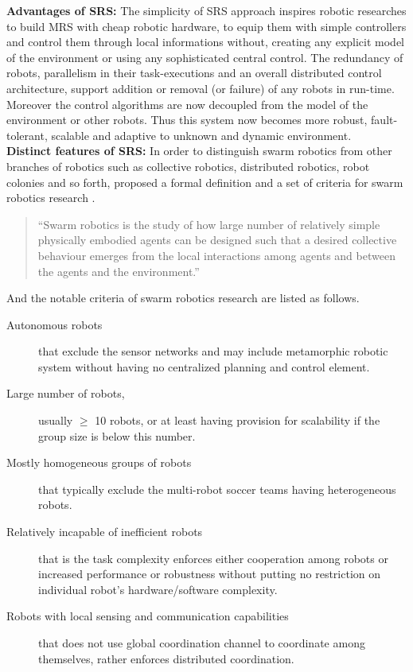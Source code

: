\textbf{Advantages of SRS:} The simplicity of SRS approach inspires robotic researches to build MRS with cheap robotic hardware, to equip them with simple controllers and control them through local informations without, creating any explicit model of the environment or using any sophisticated central control. The redundancy of robots, parallelism in their task-executions and an overall distributed control architecture, support addition or removal (or failure) of any robots in run-time. Moreover the control algorithms are now decoupled from the model of the environment or other robots. Thus this system now becomes more robust, fault-tolerant, scalable and adaptive to unknown and dynamic environment.\\
\textbf{Distinct features of SRS:}
In order to distinguish swarm robotics from other branches of robotics such as collective robotics, distributed robotics, robot colonies and so forth,  proposed a formal definition and a set of criteria for swarm robotics research . 
\begin{quotation}
``Swarm robotics is the study of how large number of relatively simple physically embodied agents can be designed such that a desired collective behaviour emerges from the local interactions among agents and between the agents and the environment.'' 
\end{quotation}
And the notable criteria of swarm robotics research are listed as follows.
\begin{description}
\item[Autonomous robots]
that exclude the sensor networks and may include metamorphic robotic system without having no centralized planning and control element.
\item[Large number of robots,]
usually $\geq$ 10 robots, or at least having provision for scalability if the group size is below this number.
\item[Mostly homogeneous groups of robots]
that typically exclude the multi-robot soccer teams having heterogeneous robots.
\item[Relatively incapable of inefficient robots]
that is the task complexity enforces either cooperation among robots or increased performance or robustness without putting no restriction on individual robot's hardware/software complexity.
\item[Robots with local sensing and communication capabilities]
that does not use global coordination channel to coordinate among themselves, rather enforces distributed coordination.
\end{description}
